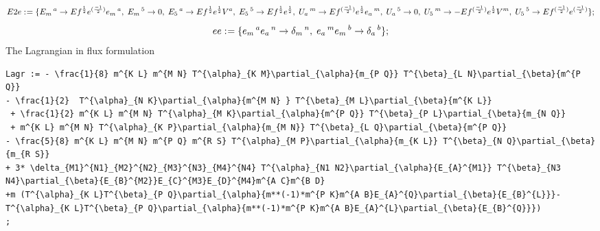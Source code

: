 \documentclass[11pt]{article}
\def\specialcolon{\mathrel{\mathop{:}}\hspace{-.5em}}
\begin{document}
\begin{dmath*}[compact, spread=2pt]
E2e\specialcolon{}= \{{E}_{m}\,^{a} \rightarrow Ef{}^{\frac{1}{2}} e{}^{(\frac{-1}{2})} {e}_{m}\,^{a},\; {E}_{m}\,^{5} \rightarrow 0,\; {E}_{5}\,^{a} \rightarrow Ef{}^{\frac{1}{2}} e{}^{\frac{1}{2}} {V}^{a},\; {E}_{5}\,^{5} \rightarrow Ef{}^{\frac{1}{2}} e{}^{\frac{1}{2}},\; {U}_{a}\,^{m} \rightarrow Ef{}^{(\frac{-1}{2})} e{}^{\frac{1}{2}} {e}_{a}\,^{m},\; {U}_{a}\,^{5} \rightarrow 0,\; {U}_{5}\,^{m} \rightarrow -Ef{}^{(\frac{-1}{2})} e{}^{\frac{1}{2}} {V}^{m},\; {U}_{5}\,^{5} \rightarrow Ef{}^{(\frac{-1}{2})} e{}^{(\frac{-1}{2})}\};
\end{dmath*}
\begin{dmath*}[compact, spread=2pt]
ee\specialcolon{}= \{{e}_{m}\,^{a} {e}_{a}\,^{n} \rightarrow {\delta}_{m}\,^{n},\; {e}_{a}\,^{m} {e}_{m}\,^{b} \rightarrow {\delta}_{a}\,^{b}\};
\end{dmath*}
The Lagrangian in flux formulation
{\color[named]{Blue}\begin{verbatim}
Lagr := - \frac{1}{8} m^{K L} m^{M N} T^{\alpha}_{K M}\partial_{\alpha}{m_{P Q}} T^{\beta}_{L N}\partial_{\beta}{m^{P Q}} 
- \frac{1}{2}  T^{\alpha}_{N K}\partial_{\alpha}{m^{M N} } T^{\beta}_{M L}\partial_{\beta}{m^{K L}}
 + \frac{1}{2} m^{K L} m^{M N} T^{\alpha}_{M K}\partial_{\alpha}{m^{P Q}} T^{\beta}_{P L}\partial_{\beta}{m_{N Q}} 
 + m^{K L} m^{M N} T^{\alpha}_{K P}\partial_{\alpha}{m_{M N}} T^{\beta}_{L Q}\partial_{\beta}{m^{P Q}} 
- \frac{5}{8} m^{K L} m^{M N} m^{P Q} m^{R S} T^{\alpha}_{M P}\partial_{\alpha}{m_{K L}} T^{\beta}_{N Q}\partial_{\beta}{m_{R S}} 
+ 3* \delta_{M1}^{N1}_{M2}^{N2}_{M3}^{N3}_{M4}^{N4} T^{\alpha}_{N1 N2}\partial_{\alpha}{E_{A}^{M1}} T^{\beta}_{N3 N4}\partial_{\beta}{E_{B}^{M2}}E_{C}^{M3}E_{D}^{M4}m^{A C}m^{B D}
+m (T^{\alpha}_{K L}T^{\beta}_{P Q}\partial_{\alpha}{m**(-1)*m^{P K}m^{A B}E_{A}^{Q}\partial_{\beta}{E_{B}^{L}}}-
T^{\alpha}_{K L}T^{\beta}_{P Q}\partial_{\alpha}{m**(-1)*m^{P K}m^{A B}E_{A}^{L}\partial_{\beta}{E_{B}^{Q}}})
;
\end{verbatim}}
\end{document}
